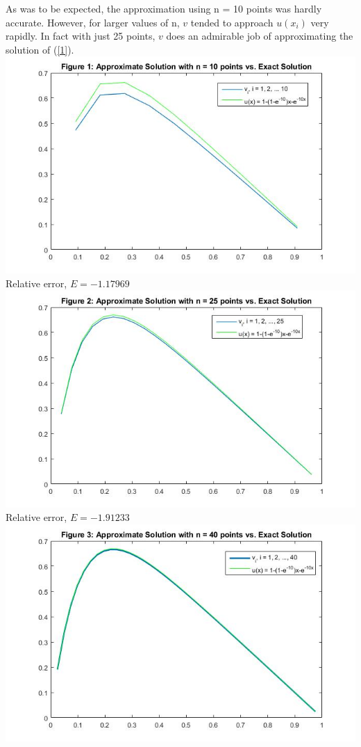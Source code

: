\documentclass[a4paper, 12pt, twoside]{article}
\begin{document}
As was to be expected, the approximation using n = 10 points was hardly accurate. However, for larger values of n, $v$ tended to approach $u(x_i)$ very rapidly. In fact with just 25 points, 
$v$ does an admirable job of approximating the solution of (\ref{1}).\\
\includegraphics[scale=.5]{fig1}\\
Relative error, $E = -1.17969$\\
\includegraphics[scale=.5]{fig2}\\
Relative error, $E = -1.91233$\\
\includegraphics[scale=.5]{fig3}\\
\end{document}
